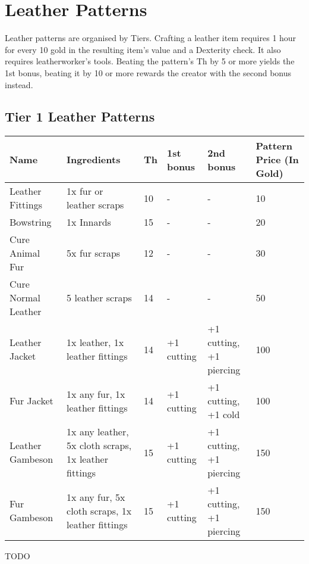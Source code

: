 \section{Leather Patterns}\label{sec:leatherPatterns}
Leather patterns are organised by Tiers.
Crafting a leather item requires 1 hour for every 10 gold in the resulting item's value and a Dexterity check.
It also requires leatherworker's tools.
Beating the pattern's Th by 5 or more yields the 1st bonus, beating it by 10 or more rewards the creator with the second bonus instead.\\

\subsection{Tier 1 Leather Patterns}
\begin{longtable}{p{1.5cm} | p{2.5cm} | l | p{2cm} | p{2cm} | p{1cm} }
	Name & Ingredients & Th  & 1st bonus & 2nd bonus & Pattern Price (In Gold)\\ \hline
	Leather Fittings & 1x fur or leather scraps & 10 & - & - & 10\\
	Bowstring & 1x Innards & 15 & - & - & 20\\
	Cure Animal Fur & 5x fur scraps & 12 & - & - & 30\\
	Cure Normal Leather & 5 leather scraps & 14 & - & - & 50\\
	Leather Jacket & 1x leather, 1x leather fittings & 14 & +1 cutting & +1 cutting, +1 piercing & 100\\
	Fur Jacket & 1x any fur, 1x leather fittings & 14 & +1 cutting & +1 cutting, +1 cold & 100\\
	Leather Gambeson & 1x any leather, 5x cloth scraps, 1x leather fittings & 15 & +1 cutting & +1 cutting, +1 piercing & 150\\
	Fur Gambeson & 1x any fur, 5x cloth scraps, 1x leather fittings & 15 & +1 cutting & +1 cutting, +1 piercing & 150\\
\end{longtable}

TODO

